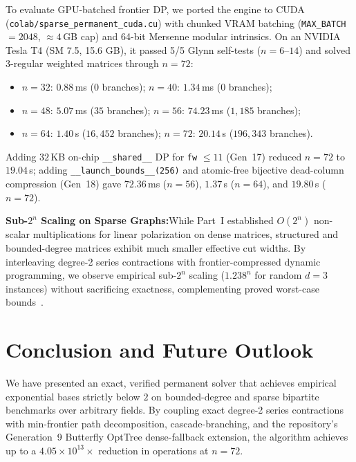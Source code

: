 \documentclass[11pt,a4paper]{article}
\theoremstyle{definition}
\newcommand{\takeaway}[2]{%
  \vspace{6pt}\noindent\colorbox{primary!8}{%
    \parbox{\dimexpr\linewidth-2\fboxsep\relax}{%
      \vspace{3pt}\textbf{\color{primary}#1:}\hspace{0.5em}#2\vspace{3pt}%
    }%
  }\vspace{6pt}%
}
\begin{document}
To evaluate GPU-batched frontier DP, we ported the engine to CUDA (\texttt{colab/sparse\_\-permanent\_\-cuda.cu}) with chunked VRAM batching (\texttt{MAX\_BATCH} $= 2048$, $\approx 4$\,GB cap) and 64-bit Mersenne modular intrinsics. On an NVIDIA Tesla T4 (SM 7.5, 15.6 GB), it passed 5/5 Glynn self-tests ($n=6\text{--}14$) and solved 3-regular weighted matrices through $n = 72$:
\begin{itemize}[leftmargin=*]
    \item $n = 32$: $0.88$\,ms ($0$ branches); $n = 40$: $1.34$\,ms ($0$ branches);
    \item $n = 48$: $5.07$\,ms ($35$ branches); $n = 56$: $74.23$\,ms ($1{,}185$ branches);
    \item $n = 64$: $1.40$\,s ($16{,}452$ branches); $n = 72$: $20.14$\,s ($196{,}343$ branches).
\end{itemize}
Adding $32$\,KB on-chip \texttt{\_\_shared\_\_} DP for \texttt{fw} $\le 11$ (Gen~17) reduced $n=72$ to $19.04$\,s; adding \texttt{\_\_launch\_bounds\_\_(256)} and atomic-free bijective dead-column compression (Gen~18) gave $72.36$\,ms ($n=56$), $1.37$\,s ($n=64$), and $19.80$\,s ($n=72$).

\takeaway{Sub-$2^n$ Scaling on Sparse Graphs}{While Part~I established $O(2^n)$ non-scalar multiplications for linear polarization on dense matrices, structured and bounded-degree matrices exhibit much smaller effective cut widths. By interleaving degree-2 series contractions with frontier-compressed dynamic programming, we observe empirical sub-$2^n$ scaling ($1.238^n$ for random $d=3$ instances) without sacrificing exactness, complementing proved worst-case bounds~\cite{servediowan2005,fominhoie2006,izumiwadayama2012,bjorklund2012,bjorklund2016}.}

\section{Conclusion and Future Outlook}

We have presented an exact, verified permanent solver that achieves empirical exponential bases strictly below $2$ on bounded-degree and sparse bipartite benchmarks over arbitrary fields. By coupling exact degree-2 series contractions with min-frontier path decomposition, cascade-branching, and the repository's Generation~9 Butterfly OptTree dense-fallback extension, the algorithm achieves up to a $4.05 \times 10^{13}\times$ reduction in operations at $n = 72$.
\end{document}
